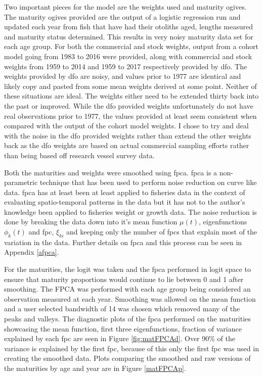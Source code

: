 \documentclass[11pt]{article}\usepackage[]{graphicx}\usepackage[]{color}
\begin{document}
Two important pieces for the model are the weights used and maturity ogives. The maturity ogives provided are the output of a logistic regression run and updated each year from fish that have had their otoliths aged, lengths measured and maturity status determined. This results in very noisy maturity data set for each age group. For both the commercial and stock weights, output from a cohort model going from 1983 to 2016 were provided, along with commercial and stock weights from 1959 to 2014 and 1959 to 2017 respectively provided by \acrshort{dfo}. The weights provided by \acrshort{dfo} are noisy, and values prior to 1977 are identical and likely copy and pasted from some mean weights derived at some point. Neither of these situations are ideal. The weights either need to be extended thirty back into the past or improved. While the \acrshort{dfo} provided weights unfortunately do not have real observations prior to 1977, the values provided at least seem consistent when compared with the output of the cohort model weights. I chose to try and deal with the noise in the \acrshort{dfo} provided weights rather than extend the other weights back as the \acrshort{dfo} weights are based on actual commercial sampling efforts rather than being based off research vessel survey data.

 Both the maturities and weights were smoothed using \acrfull{fpca}. \acrshort{fpca} is a non-parametric technique that has been used to perform noise reduction on curve like data\cite{ramsay2007applied}. \acrshort{fpca} has at least been at least applied to fisheries data in the context of evaluating spatio-temporal patterns in the data\cite{embling_2012} but it has not to the author's knowledge been applied to fisheries weight or growth data. The noise reduction is done by breaking the data down into it's mean function $\mu(t)$, eigenfunctions $\phi_k(t)$ and \acrfull{fpc}, $\xi_{ki}$ and keeping only the number of \acrshort{fpc}s that explain most of the variation in the data.  Further details on \acrshort{fpca} and this process can be seen in Appendix \ref{afpca}.

For the maturities, the logit was taken and the \acrshort{fpca} performed in logit space to ensure that maturity proportions would continue to lie between 0 and 1 after smoothing. The FPCA was performed with each age group being considered an observation measured at each year. Smoothing was allowed on the mean function and a user selected bandwidth of 14 was chosen which removed many of the peaks and valleys. The diagnostic plots of the \acrshort{fpca} performed on the maturities showcasing the mean function, first three eigenfunctions, fraction of variance explained by each \acrshort{fpc} are seen in Figure \ref{fig:matFPCAd}. Over 90\% of the variance is explained by the first \acrshort{fpc}, because of this only the first \acrshort{fpc} was used in creating the smoothed data. Plots comparing the smoothed and raw versions of the maturities by age and year are in Figure \ref{matFPCAp}.
\end{document}

